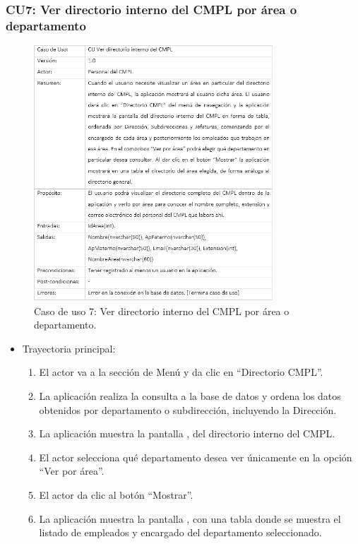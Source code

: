 		\subsubsection{CU7: Ver directorio interno del CMPL por área o departamento}
			\begin{figure}[htbp!]
				\centering
					\includegraphics[width=0.8\textwidth]{images/CU/CU7}
					\caption{Caso de uso 7: Ver directorio interno del CMPL por área o departamento.}
				\label{Tabla}
			\end{figure}
			
			\begin{itemize}
				\item Trayectoria principal:
					\begin{enumerate}
						\item El actor va a la sección de Menú y da clic en ``Directorio CMPL''.
						\item La aplicación realiza la consulta a la base de datos y ordena los datos obtenidos por departamento o subdirección, incluyendo la Dirección.
						\item La aplicación muestra la pantalla , del directorio interno del CMPL.
						\item El actor selecciona qué departamento desea ver únicamente en la opción ``Ver por área''.
						\item El actor da clic al botón ``Mostrar''.
						\item La aplicación muestra la pantalla , con una tabla donde se muestra el listado de empleados y encargado del departamento seleccionado.
					\end{enumerate}
			\end{itemize}
			
